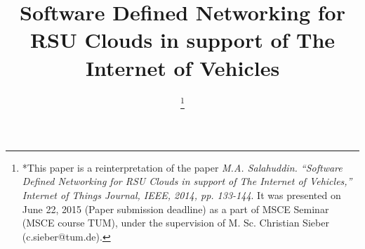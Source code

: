 \documentclass[conference]{IEEEtran}
\begin{document}
%
\title{Software Defined Networking for RSU Clouds in support of The Internet of Vehicles}


\author{

\thanks{*This paper is a reinterpretation of the paper \emph{M.A. Salahuddin. ``Software Defined Networking for RSU Clouds in support of The Internet of Vehicles,'' Internet of Things Journal, IEEE, 2014, pp. 133-144}. It was presented on June 22, 2015 (Paper submission deadline) as a part of MSCE Seminar (MSCE course TUM), under the supervision of M. Sc. 
Christian Sieber (c.sieber@tum.de).}
}


% 
\end{document}
